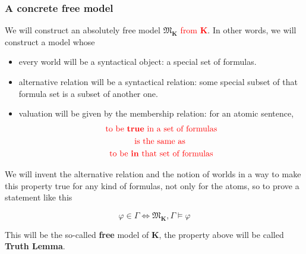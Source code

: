 \documentclass[xcolor=x11names]{beamer}
\newcommand{\cemph}[1]{\textcolor{red}{#1}}
\renewcommand{\emph}[1]{\textbf{#1}}
\begin{document}
\begin{frame}
\frametitle{A concrete free model}
We will construct an absolutely free model $\mathfrak M_\mathbf K$ \cemph{ from $\mathbf{K}$}. In other words, we will construct a model whose
\begin{itemize}
\item every world will be a syntactical object: a special set of formulas.
\item alternative relation will be a syntactical relation: some special subset of that formula set is a subset of another one.
\item valuation will be given by the membership relation: for an atomic sentence,
\begin{multline*}
\textup{\cemph{to be \emph{true} in a set of formulas}} \\ \textup{\cemph{ is the same as }} \\ \textup{ \cemph{to be \emph{in} that set of formulas }}\end{multline*}
\end{itemize}
We will invent the alternative relation and the notion of worlds in a way to make this property true for any kind of formulas, not only for the atoms, so to prove a statement like this

\[ \varphi \in \Gamma \iff \mathfrak M_{\mathbf K}, \Gamma \models \varphi \]

This will be the so-called \emph{free} model of $\mathbf K$, the property above will be called \emph{Truth Lemma}.

\end{frame}

\end{document}
